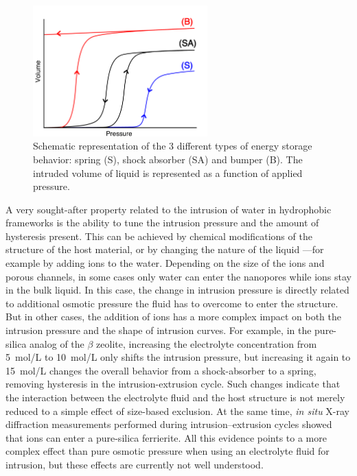 \documentclass[thesis]{subfiles}
\begin{document}
\begin{figure}[ht]
    \centering
    \includegraphics[width=0.6\textwidth]{figures/images/intrusion-shapes}
    \caption{Schematic representation of the 3 different types of energy storage
    behavior: spring (S), shock absorber (SA) and bumper (B). The intruded
    volume of liquid is represented as a function of applied pressure.}
    \label{fig:intrusion-shapes}
\end{figure}

A very sought-after property related to the intrusion of water in hydrophobic
frameworks is the ability to tune the intrusion pressure and the amount of
hysteresis present. This can be achieved by chemical modifications of the
structure of the host material\cite{AOrtiz2014}, or by changing the nature of
the liquid ---for example by adding ions to the water\cite{Ortiz2014}. Depending
on the size of the ions and porous channels, in some cases only water can enter
the nanopores while ions stay in the bulk liquid. In this case, the change in
intrusion pressure is directly related to additional osmotic pressure the fluid
has to overcome to enter the structure\cite{MichelinJamois2015}. But in other
cases, the addition of ions has a more complex impact on both the intrusion
pressure and the shape of intrusion curves. For example, in the pure-silica
analog of the $\beta$ zeolite\cite{Camblor1996}, increasing the electrolyte
concentration from \SI{5}{mol/L} to \SI{10}{mol/L} only shifts the intrusion
pressure, but increasing it again to \SI{15}{mol/L} changes the overall behavior
from a shock-absorber to a spring\cite{Ryzhikov2014}, removing hysteresis in the
intrusion-extrusion cycle. Such changes indicate that the interaction between
the electrolyte fluid and the host structure is not merely reduced to a simple
effect of size-based exclusion. At the same time, \emph{in situ} X-ray
diffraction measurements performed during intrusion--extrusion cycles showed
that  ions can enter a pure-silica ferrierite\cite{Arletti2016}. All
this evidence points to a more complex effect than pure osmotic pressure when
using an electrolyte fluid for intrusion, but these effects are currently not
well understood.
\end{document}

